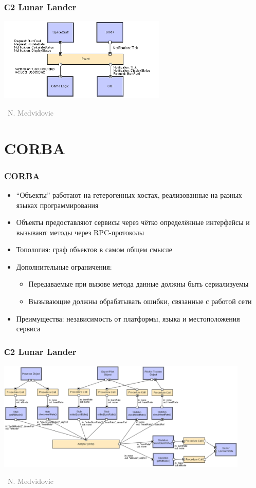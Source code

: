\documentclass[xetex,mathserif,serif]{beamer}
\newcommand{\attribution}[1] {
	\vspace{-5mm}\begin{flushright}\begin{scriptsize}\textcolor{gray}{\textcopyright\, #1}\end{scriptsize}\end{flushright}
}
\begin{document}
	\begin{frame}
		\frametitle{С2 Lunar Lander}
		\begin{center}
			\includegraphics[width=0.6\textwidth]{c2LL.png}
			\attribution{N. Medvidovic}
		\end{center}
	\end{frame}

	\section{CORBA}

	\begin{frame}
		\frametitle{CORBA}
		\begin{itemize}
			\item ``Объекты'' работают на гетерогенных хостах, реализованные на разных языках программирования 
			\item Объекты предоставляют сервисы через чётко определённые интерфейсы и вызывают методы через RPC-протоколы
			\item Топология: граф объектов в самом общем смысле
			\item Дополнительные ограничения:
			\begin{itemize}
				\item Передаваемые при вызове метода данные должны быть сериализуемы
				\item Вызывающие должны обрабатывать ошибки, связанные с работой сети
			\end{itemize}
			\item Преимущества: независимость от платформы, языка и местоположения сервиса
		\end{itemize}
	\end{frame}

	\begin{frame}
		\frametitle{С2 Lunar Lander}
		\begin{center}
			\includegraphics[width=0.9\textwidth]{corbaLL.png}
			\attribution{N. Medvidovic}
		\end{center}
	\end{frame}
\end{document}
